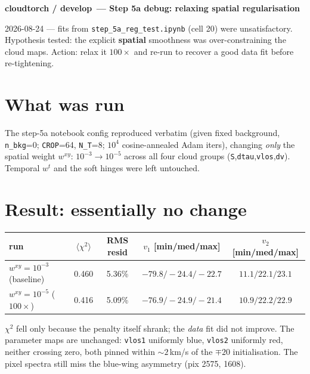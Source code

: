 \documentclass[10pt,a4paper]{article}
\newcommand{\co}[1]{{\small\texttt{#1}}}
\begin{document}
\small

{\sffamily\bfseries\large\color{acc} cloudtorch / develop\, --- Step 5a debug: relaxing spatial regularisation}

\vspace{1pt}
{\sffamily\color{gry}\footnotesize 2026-08-24 --- fits from \co{step\_5a\_reg\_test.ipynb} (cell 20) were unsatisfactory. Hypothesis tested: the explicit \textbf{spatial} smoothness was over-constraining the cloud maps. Action: relax it $100\times$ and re-run to recover a good data fit before re-tightening.}

\vspace{1pt}{\footnotesize\color{gry}\rule{\textwidth}{0.4pt}}

\section{What was run}

The step-5a notebook config reproduced verbatim (given fixed background, \co{n\_bkg}=0; \co{CROP}=64, \co{N\_T}=8; $10^4$ cosine-annealed Adam iters), changing \emph{only} the spatial weight $w^{xy}\!:\,10^{-3}\!\to\!10^{-5}$ across all four cloud groups (\co{S},\co{dtau},\co{vlos},\co{dv}). Temporal $w^{t}$ and the soft hinges were left untouched.

\section{Result: essentially no change}

\begin{center}\small
\begin{tabular}{lcccc}
\hline
run & $\langle\chi^2\rangle$ & RMS resid & $v_{1}$ [min/med/max] & $v_{2}$ [min/med/max]\\
\hline
$w^{xy}=10^{-3}$ (baseline) & 0.460 & 5.36\% & $-79.8/-24.4/-22.7$ & $11.1/22.1/23.1$\\
$w^{xy}=10^{-5}$ ($100\times$) & 0.416 & 5.09\% & $-76.9/-24.9/-21.4$ & $10.9/22.2/22.9$\\
\hline
\end{tabular}
\end{center}

$\chi^2$ fell only because the penalty itself shrank; the \emph{data} fit did not improve. The parameter maps are unchanged: \co{vlos1} uniformly blue, \co{vlos2} uniformly red, neither crossing zero, both pinned within $\sim\!2$\,km/s of the $\mp20$ initialisation. The pixel spectra still miss the blue-wing asymmetry (pix 2575, 1608).
\end{document}
